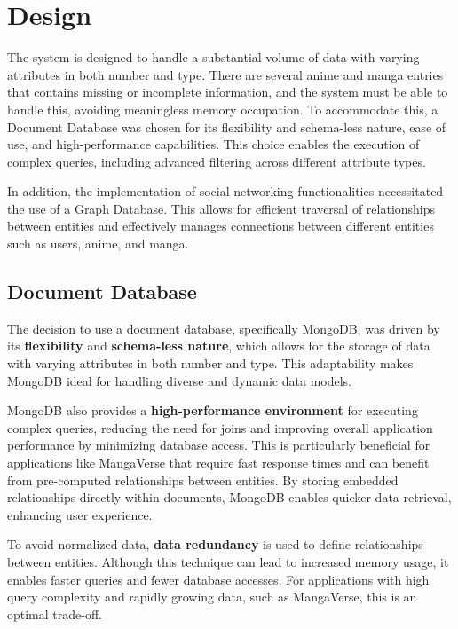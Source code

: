 \chapter{Design}
The system is designed to handle a substantial volume of data with varying attributes in both number and type.
There are several anime and manga entries that contains missing or incomplete information,
and the system must be able to handle this, avoiding meaningless memory occupation. To accommodate this,
a Document Database was chosen for its flexibility and schema-less nature, ease of use, and high-performance
capabilities. This choice enables the execution of complex queries, including advanced filtering across different attribute types.

\vspace{\baselineskip}

In addition, the implementation of social networking functionalities necessitated the use of a Graph Database.
This allows for efficient traversal of relationships between entities and effectively manages connections between
different entities such as users, anime, and manga.


\section{Document Database}

The decision to use a document database, specifically MongoDB,  was driven by its \textbf{flexibility}
and \textbf{schema-less nature}, which allows for the storage of data with varying attributes in both number and type.
This adaptability makes MongoDB ideal for handling diverse and dynamic data models.

\vspace{\baselineskip}

MongoDB also provides a \textbf{high-performance environment} for executing complex queries,
reducing the need for joins and improving overall application performance by minimizing database
access. This is particularly beneficial for applications like MangaVerse that require fast response
times and can benefit from pre-computed relationships between entities. By storing embedded
relationships directly within documents, MongoDB enables quicker data retrieval, enhancing user experience.

\vspace{\baselineskip}

To avoid normalized data, \textbf{data redundancy} is used to define relationships between entities.
Although this technique can lead to increased memory usage, it enables faster queries and fewer
database accesses. For applications with high query complexity and rapidly growing data,
such as MangaVerse, this is an optimal trade-off.

